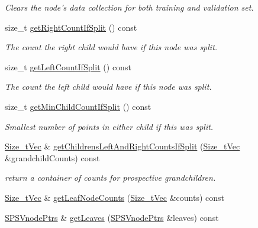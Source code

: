\begin{DoxyCompactItemize}
\begin{DoxyCompactList}\small\item\em \-Clears the node's data collection for both training and validation set. \end{DoxyCompactList}\item 
size\-\_\-t \hyperlink{classsubpavings_1_1SPSVnode_a9a51fbde60e061846a93981688cc67af}{get\-Right\-Count\-If\-Split} () const 
\begin{DoxyCompactList}\small\item\em \-The count the right child would have if this node was split. \end{DoxyCompactList}\item 
size\-\_\-t \hyperlink{classsubpavings_1_1SPSVnode_a64b5d63790c02a454aa0e86222b1a3d3}{get\-Left\-Count\-If\-Split} () const 
\begin{DoxyCompactList}\small\item\em \-The count the left child would have if this node was split. \end{DoxyCompactList}\item 
size\-\_\-t \hyperlink{classsubpavings_1_1SPSVnode_a43024ae81075f8a822ccccad013b3ef7}{get\-Min\-Child\-Count\-If\-Split} () const 
\begin{DoxyCompactList}\small\item\em \-Smallest number of points in either child if this was split. \end{DoxyCompactList}\item 
\hyperlink{namespacesubpavings_a612fc5639b45583b9fd33bd304354f81}{\-Size\-\_\-t\-Vec} \& \hyperlink{classsubpavings_1_1SPSVnode_ad1e930cb7befb42cd1985e91f3ddd9b6}{get\-Childrens\-Left\-And\-Right\-Counts\-If\-Split} (\hyperlink{namespacesubpavings_a612fc5639b45583b9fd33bd304354f81}{\-Size\-\_\-t\-Vec} \&grandchild\-Counts) const 
\begin{DoxyCompactList}\small\item\em return a container of counts for prospective grandchildren. \end{DoxyCompactList}\item 
\hyperlink{namespacesubpavings_a612fc5639b45583b9fd33bd304354f81}{\-Size\-\_\-t\-Vec} \& \hyperlink{classsubpavings_1_1SPSVnode_a0d6df4752e05170510e43b67d8eb3110}{get\-Leaf\-Node\-Counts} (\hyperlink{namespacesubpavings_a612fc5639b45583b9fd33bd304354f81}{\-Size\-\_\-t\-Vec} \&counts) const 
\item 
\hyperlink{namespacesubpavings_a90b5f0e33fa46403066cc5a89929e6a9}{\-S\-P\-S\-Vnode\-Ptrs} \& \hyperlink{classsubpavings_1_1SPSVnode_a6f3850e716947e051a9e9af16c2b4508}{get\-Leaves} (\hyperlink{namespacesubpavings_a90b5f0e33fa46403066cc5a89929e6a9}{\-S\-P\-S\-Vnode\-Ptrs} \&leaves) const 

\end{DoxyCompactItemize}
